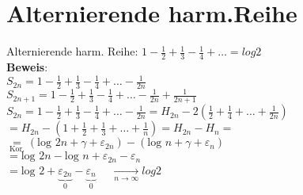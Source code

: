 \section{Alternierende harm.Reihe}
\newcommand{\altharm}{1-\frac{1}{2}+\frac{1}{3} - \frac{1}{4}+\dots}
Alternierende harm. Reihe: $\altharm = log 2$\medskip\\
\textbf{Beweis}:\\
$S_{2n} = \altharm - \frac{1}{2n}$\smallskip\\
$S_{2n+1}= \altharm -  \frac{1}{2n} + \frac{1}{2n+1}$\medskip\\
$S_{2n} = \altharm - \frac{1}{2n} = H_{2n}-2(\frac{1}{2}+\frac{1}{4}+\dots+\frac{1}{2n})$\smallskip\\
$=H_{2n} - (1+\frac{1}{2}+\frac{1}{3}+\dots+\frac{1}{n})=H_{2n}-H_n = $\smallskip\\
$\underset{\text{Kor.}}{=} (\text{log }2n+ \gamma + \varepsilon_{2n}) - (\text{log }n + \gamma + \varepsilon_n)$\smallskip\\
$=\text{log }2n - \text{log }n + \varepsilon_{2n}-\varepsilon_n$\smallskip\\
$=\text{log }2 + \underbrace{\varepsilon_{2n}}_0-\underbrace{\varepsilon_n}_0\quad$
$\underset{n\rightarrow\infty}{\rightarrow} log 2$

